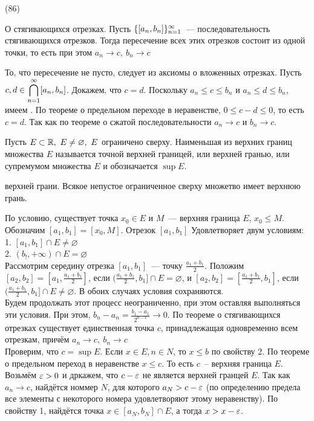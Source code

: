 (86)

\T \q О стягивающихся отрезках. Пусть $\{[a_n, b_n]\}^{\infty}_{n = 1}$~--- последовательность стягивающихся отрезков. Тогда пересечение всех этих отрезков состоит из одной точки, то есть
при этом $a_n \to c,\ b_n \to c$

\D То, что пересечение не пусто, следует из аксиомы о вложенных отрезках. Пусть $c, d \in \displaystyle \bigcap\limits^{\infty}_{n = 1} [a_n, b_n]$. Докажем, что $c = d$. Поскольку $a_n \le c \le b_n$ и $a_n \le d \le b_n$, имеем . По теореме о предельном переходе в неравенстве, $0 \le c - d \le 0$, то есть $c = d$. Так как  по теореме о сжатой последовательности $a_n \to c$ и $b_n \to c$.

\Op Пусть $E \subset \R,\ E \neq \varnothing,\ E$ ограничено сверху. Наименьшая из верхних границ множества $E$ называется точной верхней границей, или верхней гранью, или супремумом множества $E$ и обозначается $\sup E$.

\T {} верхней грани. Всякое непустое ограниченное сверху множетво имеет верхнюю грань.

\D По условию, существует точка $x_0 \in E$ и $M$~--- верхняя граница $E$, $x_0 \le M$. Обозначим $[a_1, b_1] = [x_0, M]$. Отрезок $[a_1, b_1]$ Удовлетворяет двум условиям:\\
1. $[a_1, b_1] \cap E \neq \varnothing$\\
2. $(b_!, +\infty) \cap E = \varnothing$\\
Рассмотрим середину отрезка $[a_1, b_1]$~--- точку $\frac{a_1 + b_1}2$. Положим $[a_2, b_2] = [a_1, \frac{a_1 + b_1}2]$, если $(\frac{a_1 + b_1}2, b_1] \cap E = \varnothing$, и $[a_2, b_2] = [\frac{a_1 + b_1}2, b_1]$, если $(\frac{a_1 + b_1}2, b_1]\cap E \neq \varnothing$. В обоих случаях условия сохраняются.\\
Будем продолжать этот процесс неограниченно, при этом оставляя выполняться эти условия. При этом, $b_n - a_n = \frac{b_1 - a_1}{2^{n - 1}} \to 0$. По теореме о стягивающихся отрезках существует единственная точка $c$, принадлежащая одновременно всем отрезкам, причём $a_n \to c,\ b_n\to c$\\
Проверим, что $c = \sup E$. Если $x \in E, n \in N$, то $x\le b$ по свойству 2. По теореме о предельном переход в неравенстве $x \le c$. То есть $c$~-- верхняя граница $E$. Возьмём $\varepsilon > 0$ и дркажем, что $c - \varepsilon$ не является верхней гранцей $E$. Так как $a_n \to c$, найдётся номмер $N$, для которого $a_N > c - \varepsilon$ (по определению предела все элементы с некоторого номера удовлетворяют этому неравенству). По свойству 1, найдётся точка $x \in [a_N, b_N] \cap E$, а тогда $x > x - \varepsilon$.

